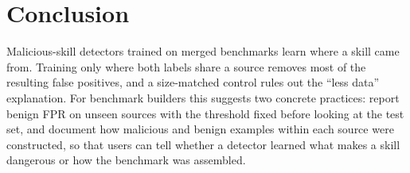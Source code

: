\section{Conclusion}
\label{sec:conclusion}
Malicious-skill detectors trained on merged benchmarks learn where a skill came from. Training only where both
labels share a source removes most of the resulting false positives, and a size-matched control rules out the
``less data'' explanation. \ConclusionMechanism{} For benchmark builders this suggests two concrete practices:
report benign FPR on unseen sources with the threshold fixed before looking at the test set, and document how
malicious and benign examples within each source were constructed, so that users can tell whether a detector
learned what makes a skill dangerous or how the benchmark was assembled.
